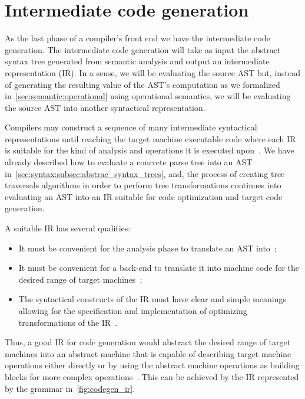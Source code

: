 \documentclass[
  oneside,
  english,
  coorientadorbanca,
  noabntexcite
]{ufsc-thesis-rn46-2019}
\begin{document}
\section{Intermediate code generation}\label{chapter:background:sec:intermediate}

As the last phase of a compiler's front end we have the intermediate code generation.
The intermediate code generation will take as input the abstract syntax tree generated from semantic analysis and output an intermediate representation (IR).
In a sense, we will be evaluating the source AST but, instead of generating the resulting value of the AST's computation as we formalized in~\cref{sec:semantic:operational} using operational semantics, we will be evaluating the source AST into another syntactical representation.

Compilers may construct a sequence of many intermediate syntactical representations until reaching the target machine executable code where each IR is suitable for the kind of analysis and operations it is executed upon~\cite{Aho:2006:CPT:1177220}.
We have already described how to evaluate a concrete parse tree into an AST in~\cref{sec:syntax:subsec:abstrac_syntax_trees}, and, the process of creating tree traversals algorithms in order to perform tree transformations continues into evaluating an AST into an IR suitable for code optimization and target code generation.

A suitable IR has several qualities:
\begin{itemize}
  \item It must be convenient for the analysis phase to translate an AST into~\cite{appel2003modern};
  \item It must be convenient for a back-end to translate it into machine code for the desired range of target machines~\cite{appel2003modern};
  \item The syntactical constructs of the IR must have clear and simple meanings allowing for the specification and implementation of optimizing transformations of the IR~\cite{appel2003modern}.
\end{itemize}
Thus, a good IR for code generation would abstract the desired range of target machines into an abstract machine that is capable of describing target machine operations either directly or by using the abstract machine operations as building blocks for more complex operations~\cite{appel2003modern}.
This can be achieved by the IR represented by the grammar in~\cref{fig:codegen_ir}.
\end{document}
